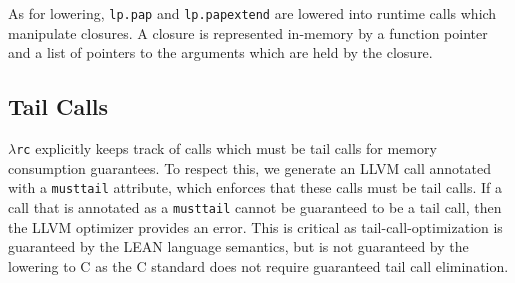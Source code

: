 \documentclass[conference]{IEEEtran}
\newcommand{\lppap}{\textcolor{pairedTwoDarkBlue}{\texttt{lp.pap}}}
\newcommand{\lppapextend}{\textcolor{pairedTwoDarkBlue}{\texttt{lp.papextend}}}
\newcommand{\lambdarc}{\ensuremath{\lambda}\texttt{rc}}
\begin{document}
As for lowering, \lppap{} and \lppapextend{} are lowered into runtime calls which manipulate closures.  A closure is represented in-memory by a function pointer and a list of pointers to the arguments which are held by the closure.


\subsection{Tail Calls}

\lambdarc{} explicitly keeps track of calls which must be tail calls for
memory consumption guarantees.  To respect this, we generate an LLVM call
annotated with a \texttt{musttail} attribute, which enforces that these calls
must be tail calls. If a call that is annotated as a \texttt{musttail} cannot be guaranteed to be
a tail call, then the LLVM optimizer provides an error. This is critical as tail-call-optimization is guaranteed by the LEAN language semantics, but is not guaranteed by the lowering to C as the C standard
does not require guaranteed tail call elimination.







\end{document}
